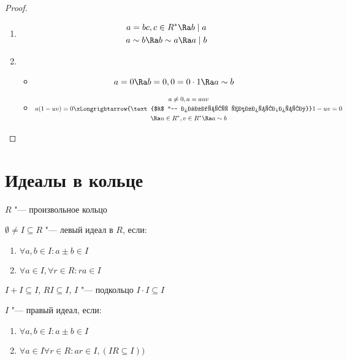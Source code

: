 \begin{proof}
	\begin{enumerate}
		\item \begin{gather*}
			a = bc, c \in R^* \Ra b \mid a \\
			a \sim b \Ra b \sim a \Ra a \mid b
		\end{gather*}
		\item \begin{itemize}
			\item \[ a = 0 \Ra b = 0, 0  = 0 \cdot 1 \Ra a \sim b \]
			\item \begin{gather*}
				a \ne 0, a = auv \\
				a(1 - uv) = 0 \xLongrightarrow{\text{$R$ "--- область целостности}} 1 - uv = 0 \\
				\Ra u \in R^*, v \in R^* \Ra a \sim b
			\end{gather*}
		\end{itemize}
	\end{enumerate}
\end{proof}

\section{Идеалы в кольце}
$R$ "--- произвольное кольцо

\begin{Def}
	$\emptyset \ne I \subseteq R$ "--- левый идеал в $R$, если:
	\begin{enumerate}
		\item $ \forall a, b \in I \colon a \pm b \in I $
		\item $ \forall a \in I, \forall r \in R \colon ra \in I $
	\end{enumerate}
\end{Def}

\begin{Rem}
$I + I \subseteq I$, $RI \subseteq I$, $I$ "--- подкольцо $I \cdot I \subseteq I$
\end{Rem}

\begin{Def}
	$I$ "--- правый идеал, если:
	\begin{enumerate}
		\item $ \forall a, b \in I \colon a \pm b \in I $
		\item $ \forall a \in I \forall r \in R \colon ar \in I, (IR \subseteq I)) $
	\end{enumerate}
\end{Def}

